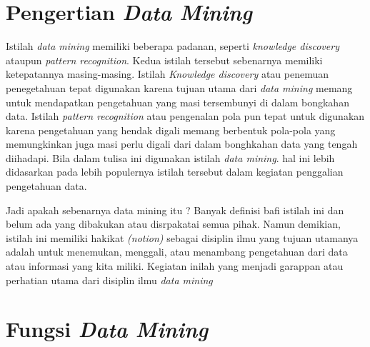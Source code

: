 \section{Pengertian \textit{Data Mining}}
Istilah \textit{data mining} memiliki beberapa padanan, seperti \textit{knowledge discovery} ataupun  \textit{pattern recognition}. Kedua istilah tersebut sebenarnya memiliki ketepatannya masing-masing. Istilah \textit{Knowledge discovery} atau penemuan penegetahuan tepat digunakan karena tujuan utama dari \textit{data mining} memang untuk mendapatkan pengetahuan yang masi tersembunyi di dalam bongkahan data. Istilah \textit{pattern recognition} atau pengenalan pola pun tepat untuk digunakan karena pengetahuan yang hendak digali memang berbentuk pola-pola yang memungkinkan juga masi perlu digali dari dalam bonghkahan data yang tengah diihadapi. Bila dalam tulisa ini digunakan istilah \textit{data mining}. hal ini lebih didasarkan pada lebih populernya istilah tersebut dalam kegiatan penggalian pengetahuan data.\cite{susanto2010pengantar}



\par Jadi apakah sebenarnya data mining itu ? Banyak definisi bafi istilah ini dan belum ada yang dibakukan atau disrpakatai semua pihak. Namun demikian, istilah ini memiliki hakikat \textit{(notion)} sebagai disiplin ilmu yang tujuan utamanya adalah untuk menemukan, menggali, atau menambang pengetahuan dari data atau informasi yang kita miliki. Kegiatan inilah yang menjadi garappan atau perhatian utama dari disiplin ilmu \textit{data mining}


\section{Fungsi \textit{Data Mining}}
